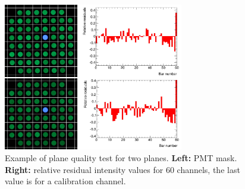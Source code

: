 \documentclass[a4paper,11pt]{article}
\begin{document}
\begin{figure}[htb]
 \centering
 \includegraphics[width=0.7\textwidth]{./two_planes}
 \caption[Example of plane quality tests]{Example of plane quality test for two planes. {\bf Left:} PMT mask. {\bf Right:} relative residual intensity values for 60
 channels, the last value is for a calibration channel.}
 \label{fig:plane_tests_two_planes}
\end{figure}











\end{document}
